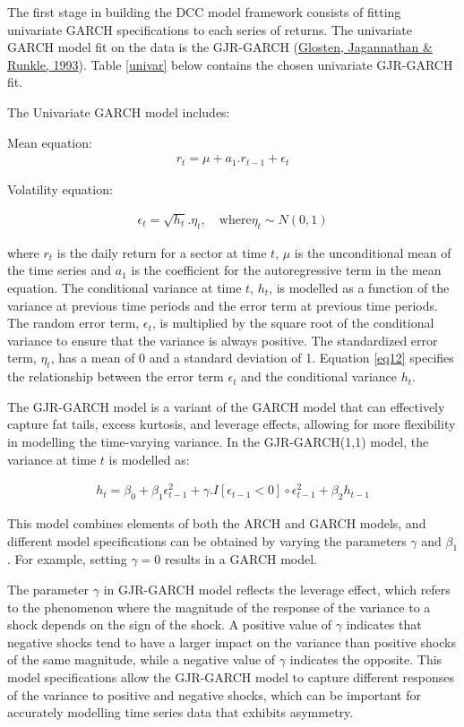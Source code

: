 \documentclass[11pt,preprint, authoryear]{elsarticle}
\numberwithin{equation}{section}
\numberwithin{figure}{section}
\numberwithin{table}{section}
\begin{document}
The first stage in building the DCC model framework consists of fitting
univariate GARCH specifications to each series of returns. The
univariate GARCH model fit on the data is the GJR-GARCH
(\protect\hyperlink{ref-glosten1993relation}{Glosten, Jagannathan \&
Runkle, 1993}). Table \ref{univar} below contains the chosen univariate
GJR-GARCH fit.

The Univariate GARCH model includes:

Mean equation: \begin{align}
  r_t = \mu + a_1. r_{t-1} + \epsilon_t  \label{eq11}
\end{align}

Volatility equation:

\begin{align}
  \epsilon_t = \sqrt{h_t}.\eta_t, \quad \text{where} \eta_t \sim N(0,1)  \label{eq12}
\end{align}

where \(r_t\) is the daily return for a sector at time \(t\), \(\mu\) is
the unconditional mean of the time series and \(a_1\) is the coefficient
for the autoregressive term in the mean equation. The conditional
variance at time \(t\), \(h_t\), is modelled as a function of the
variance at previous time periods and the error term at previous time
periods. The random error term, \(\epsilon_t\), is multiplied by the
square root of the conditional variance to ensure that the variance is
always positive. The standardized error term, \(\eta_t\), has a mean of
0 and a standard deviation of 1. Equation \ref{eq12} specifies the
relationship between the error term \(\epsilon_t\) and the conditional
variance \(h_t\).

The GJR-GARCH model is a variant of the GARCH model that can effectively
capture fat tails, excess kurtosis, and leverage effects, allowing for
more flexibility in modelling the time-varying variance. In the
GJR-GARCH(1,1) model, the variance at time \(t\) is modelled as:

\begin{align}
  h_t = \beta_0 + \beta_1 \epsilon_{t-1}^2 + \gamma . I[\epsilon_{t-1}<0] \circ \epsilon_{t-1}^2 + \beta_2 h_{t-1}  \label{eq13}
\end{align}

This model combines elements of both the ARCH and GARCH models, and
different model specifications can be obtained by varying the parameters
\(\gamma\) and \(\beta_1\). For example, setting \(\gamma = 0\) results
in a GARCH model.

The parameter \(\gamma\) in GJR-GARCH model reflects the leverage
effect, which refers to the phenomenon where the magnitude of the
response of the variance to a shock depends on the sign of the shock. A
positive value of \(\gamma\) indicates that negative shocks tend to have
a larger impact on the variance than positive shocks of the same
magnitude, while a negative value of \(\gamma\) indicates the opposite.
This model specifications allow the GJR-GARCH model to capture different
responses of the variance to positive and negative shocks, which can be
important for accurately modelling time series data that exhibits
asymmetry.
\end{document}
